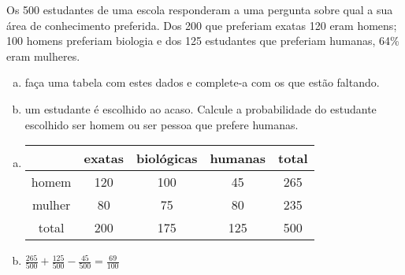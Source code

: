 \begin{ex}
Os 500 estudantes de uma escola responderam a uma pergunta sobre qual a sua área de conhecimento preferida. Dos 200 que preferiam exatas 120 eram homens; 100 homens preferiam biologia e dos 125 estudantes que preferiam humanas, 64\% eram mulheres.
   \begin{enumerate}[(a)]
   \item faça uma tabela com estes dados e complete-a com os que estão faltando.
   \item um estudante é escolhido ao acaso. Calcule a probabilidade do estudante escolhido ser homem ou ser pessoa que prefere humanas.
   \end{enumerate}
     \begin{sol}
       \phantom{A} 
        \begin{enumerate} [(a)]
            \item 
       \begin{tabular}{|c|c|c|c|c|}  \hline
           &exatas&biológicas&humanas&total  \\ \hline
   homem&120&100&45&265  \\  \hline
   mulher&80&75&80&235  \\  \hline
   total &200&175&125&500  \\  \hline 
       \end{tabular}
          \item $\frac{265}{500}+\frac{125}{500}-\frac{45}{500}=\frac{69}{100}$
       \end{enumerate}
     \end{sol}
\end{ex}